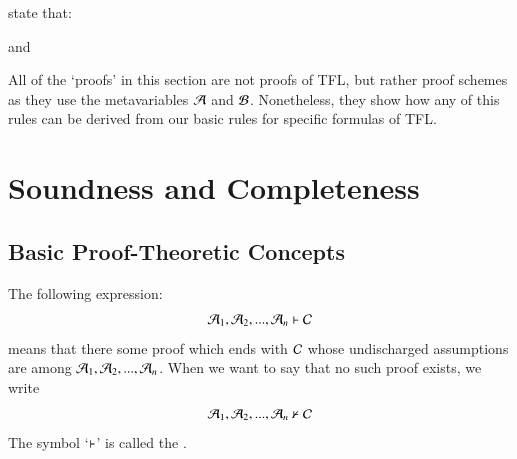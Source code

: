 \documentclass[12pt, a4paper, oneside, openright, titlepage]{book}
\begin{document}
\begin{defn}
     state that: \begin{fitchproof}
         
    \end{fitchproof}
    \begin{fitchproof}
         
    \end{fitchproof}
     \begin{fitchproof}
          
    \end{fitchproof}
    and
    \begin{fitchproof}
         
    \end{fitchproof}
\end{defn}


\begin{rmk}
    All of the `proofs' in this section are not proofs of TFL, but rather proof schemes as they use the metavariables $\mathcal{A}$ and $\mathcal{B}$. Nonetheless, they show how any of this rules can be derived from our basic rules for specific formulas of TFL.
\end{rmk}











\chapter{\textsection\textsection Soundness and Completeness}

\section{\textsection Basic Proof-Theoretic Concepts}

\begin{defn}
    The following expression: \begin{equation*}
        \mathcal{A}_1,\mathcal{A}_2,...,\mathcal{A}_n\vdash\mathcal{C}
    \end{equation*}
    means that there  some proof which ends with $\mathcal{C}$ whose undischarged assumptions are among $\mathcal{A}_1,\mathcal{A}_2,...,\mathcal{A}_n$. When we want to say that no such proof exists, we write \begin{equation*}
        \mathcal{A}_1,\mathcal{A}_2,...,\mathcal{A}_n\nvdash\mathcal{C}
    \end{equation*}
    The symbol `$\vdash$' is called the .
\end{defn}
\end{document}
